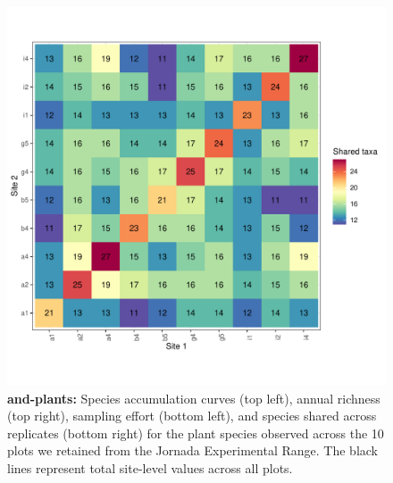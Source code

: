 \documentclass[11pt, oneside]{article}
\begin{document}
\begin{figure}[h!]
\includegraphics[scale = 0.4]{jrn-plants-compagnoni_spp_shared.pdf}
\caption{{\bf and-plants:} Species accumulation curves (top left),  annual richness (top right), sampling effort (bottom left), and species shared across replicates (bottom right) for the plant species observed across the 10 plots we retained from the Jornada Experimental Range. The black lines represent total site-level values across all plots.}
\label{jrn-plants}
\end{figure}
\end{document}
